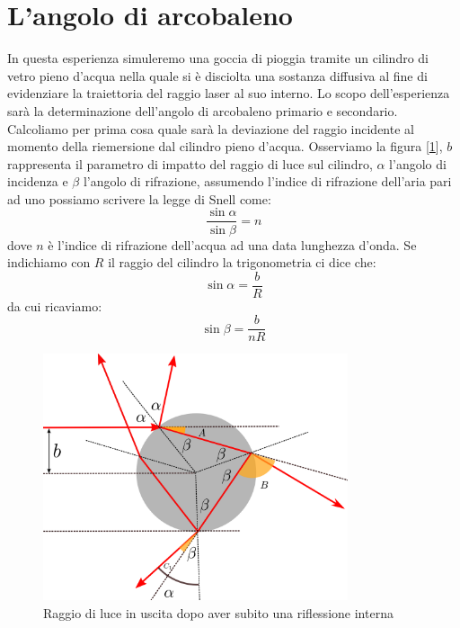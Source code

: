 \documentclass[a4paper,10pt,oneside]{article}
\begin{document}
\section*{L'angolo di arcobaleno}

In questa esperienza simuleremo una goccia di pioggia tramite un cilindro di vetro pieno d'acqua nella quale  si è disciolta una sostanza diffusiva al fine di evidenziare la traiettoria del raggio laser al suo interno. Lo scopo dell'esperienza sarà la determinazione dell'angolo di arcobaleno primario e secondario. Calcoliamo per prima cosa quale sarà la deviazione  del raggio incidente al momento della riemersione dal cilindro pieno d'acqua. Osserviamo la figura [\ref{fig:b_positivo}], $b$ rappresenta il parametro di impatto del raggio di luce sul cilindro, $\alpha$ l'angolo di incidenza e $\beta$ l'angolo di rifrazione, assumendo l'indice di rifrazione dell'aria pari ad uno possiamo scrivere la legge di Snell come:
\begin{equation}
 \frac{\sin\alpha}{\sin\beta}=n
\end{equation}
dove $n$ è l'indice di rifrazione dell'acqua ad una data lunghezza d'onda. Se indichiamo con $R$ il raggio del cilindro la trigonometria ci dice che:
\begin{equation}
 \sin\alpha=\frac{b}{R}
\end{equation}
da cui ricaviamo:
\begin{equation}
 \sin\beta=\frac{b}{nR}
\end{equation}



\begin{figure}[H]
 \centering
 \includegraphics[width=0.8\textwidth]{./Immagini/b_positivo.png}
 \caption{Raggio di luce in uscita dopo aver subito una riflessione interna}
 \label{fig:b_positivo}
\end{figure}
\end{document}

